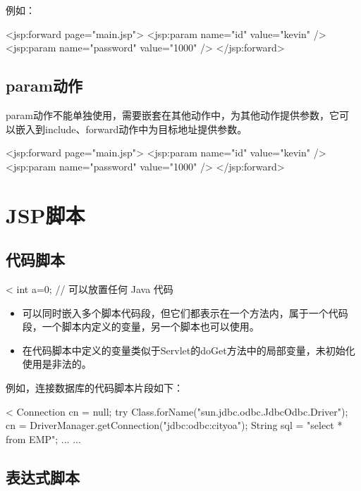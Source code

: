 例如：
\begin{jspCode}
  <jsp:forward page="main.jsp">
    <jsp:param name="id" value="kevin" />
    <jsp:param name="password" value="1000" />
  </jsp:forward>
\end{jspCode}

\subsection{param动作} 

param动作不能单独使用，需要嵌套在其他动作中，为其他动作提供参数，它可
以嵌入到include、forward动作中为目标地址提供参数。

\begin{jspCode}
  <jsp:forward page="main.jsp">
    <jsp:param name="id" value="kevin" />
    <jsp:param name="password" value="1000" />
  </jsp:forward>
\end{jspCode}

\section{JSP脚本}

\subsection{代码脚本}
  
\begin{jspCode}
  <%
    int a=0; // 可以放置任何 Java 代码
\end{jspCode}  
\begin{itemize}
\item 可以同时嵌入多个脚本代码段，但它们都表示在一个方法内，属于一个代码段，一个脚本内定义的变量，另一个脚本也可以使用。
\item 在代码脚本中定义的变量类似于Servlet的doGet方法中的局部变量，未初始化使用是非法的。
\end{itemize}

{\kai 例如，连接数据库的代码脚本片段如下：}
\begin{jspCode}
  <%
  Connection cn = null;
  try {
    Class.forName("sun.jdbc.odbc.JdbcOdbc.Driver");
    cn  = DriverManager.getConnection("jdbc:odbc:cityoa");
    String sql = "select * from EMP";
    ... ...
  }
\end{jspCode}

\subsection{表达式脚本}

